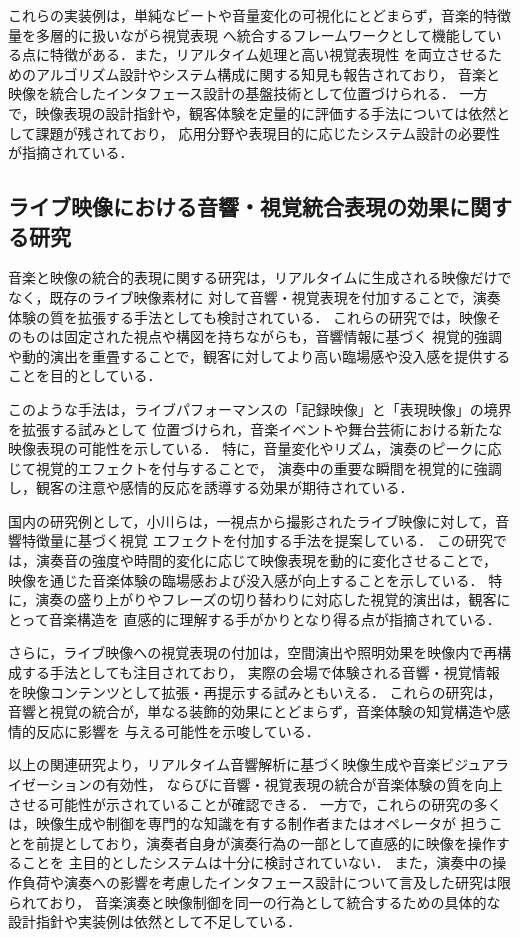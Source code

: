 これらの実装例は，単純なビートや音量変化の可視化にとどまらず，音楽的特徴量を多層的に扱いながら視覚表現
へ統合するフレームワークとして機能している点に特徴がある．また，リアルタイム処理と高い視覚表現性
を両立させるためのアルゴリズム設計やシステム構成に関する知見も報告されており，
音楽と映像を統合したインタフェース設計の基盤技術として位置づけられる．
一方で，映像表現の設計指針や，観客体験を定量的に評価する手法については依然として課題が残されており，
応用分野や表現目的に応じたシステム設計の必要性が指摘されている．


\subsection{ライブ映像における音響・視覚統合表現の効果に関する研究}
音楽と映像の統合的表現に関する研究は，リアルタイムに生成される映像だけでなく，既存のライブ映像素材に
対して音響・視覚表現を付加することで，演奏体験の質を拡張する手法としても検討されている．
これらの研究では，映像そのものは固定された視点や構図を持ちながらも，音響情報に基づく
視覚的強調や動的演出を重畳することで，観客に対してより高い臨場感や没入感を提供することを目的としている．

このような手法は，ライブパフォーマンスの「記録映像」と「表現映像」の境界を拡張する試みとして
位置づけられ，音楽イベントや舞台芸術における新たな映像表現の可能性を示している．
特に，音量変化やリズム，演奏のピークに応じて視覚的エフェクトを付与することで，
演奏中の重要な瞬間を視覚的に強調し，観客の注意や感情的反応を誘導する効果が期待されている．

国内の研究例として，小川らは，一視点から撮影されたライブ映像に対して，音響特徴量に基づく視覚
エフェクトを付加する手法を提案している．
この研究では，演奏音の強度や時間的変化に応じて映像表現を動的に変化させることで，
映像を通じた音楽体験の臨場感および没入感が向上することを示している\cite{ogawa}．
特に，演奏の盛り上がりやフレーズの切り替わりに対応した視覚的演出は，観客にとって音楽構造を
直感的に理解する手がかりとなり得る点が指摘されている．

さらに，ライブ映像への視覚表現の付加は，空間演出や照明効果を映像内で再構成する手法としても注目されており，
実際の会場で体験される音響・視覚情報を映像コンテンツとして拡張・再提示する試みともいえる．
これらの研究は，音響と視覚の統合が，単なる装飾的効果にとどまらず，音楽体験の知覚構造や感情的反応に影響を
与える可能性を示唆している．

以上の関連研究より，リアルタイム音響解析に基づく映像生成や音楽ビジュアライゼーションの有効性，
ならびに音響・視覚表現の統合が音楽体験の質を向上させる可能性が示されていることが確認できる．
一方で，これらの研究の多くは，映像生成や制御を専門的な知識を有する制作者またはオペレータが
担うことを前提としており，演奏者自身が演奏行為の一部として直感的に映像を操作することを
主目的としたシステムは十分に検討されていない．
また，演奏中の操作負荷や演奏への影響を考慮したインタフェース設計について言及した研究は限られており，
音楽演奏と映像制御を同一の行為として統合するための具体的な設計指針や実装例は依然として不足している．

